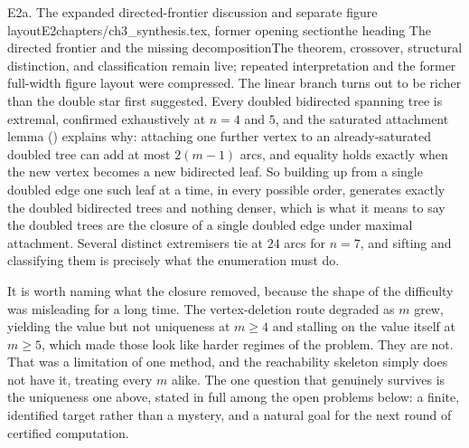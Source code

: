 \begin{offcut}{E2a. The expanded directed-frontier discussion and separate figure layout}{E2}{chapters/ch3\_synthesis.tex, former opening section}{the heading The directed frontier and the missing decomposition}{The theorem, crossover, structural distinction, and classification remain live; repeated interpretation and the former full-width figure layout were compressed.}
The linear branch turns out to be richer than the double star first suggested. Every doubled bidirected spanning tree is extremal, confirmed exhaustively at $n = 4$ and $5$, and the saturated attachment lemma () explains why: attaching one further vertex to an already-saturated doubled tree can add at most $2(m-1)$ arcs, and equality holds exactly when the new vertex becomes a new bidirected leaf. So building up from a single doubled edge one such leaf at a time, in every possible order, generates exactly the doubled bidirected trees and nothing denser, which is what it means to say the doubled trees are the closure of a single doubled edge under maximal attachment. Several distinct extremisers tie at $24$ arcs for $n = 7$, and sifting and classifying them is precisely what the enumeration must do.

It is worth naming what the closure removed, because the shape of the difficulty was misleading for a long time. The vertex-deletion route degraded as $m$ grew, yielding the value but not uniqueness at $m \ge 4$ and stalling on the value itself at $m \ge 5$, which made those look like harder regimes of the problem. They are not. That was a limitation of one method, and the reachability skeleton simply does not have it, treating every $m$ alike. The one question that genuinely survives is the uniqueness one above, stated in full among the open problems below: a finite, identified target rather than a mystery, and a natural goal for the next round of certified computation.
\end{offcut}


